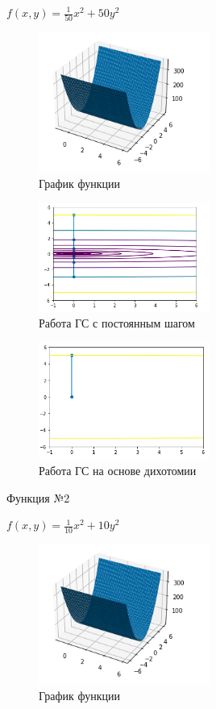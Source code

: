 $f(x,y) = \frac{1}{50}x^2 + 50y^2$

\begin{figure}[ht]
    \centering
    \includegraphics[width=0.5\textwidth]{images/g10.png}
    \caption{График функции}
    \label{fig:g10}
\end{figure}

\begin{figure}[ht]
    \centering
    \includegraphics[width=0.5\textwidth]{images/g11.png}
    \caption{Работа ГС с постоянным шагом}
    \label{fig:g11}
\end{figure}

\begin{figure}[ht]
    \centering
    \includegraphics[width=0.5\textwidth]{images/g12.png}
    \caption{Работа ГС на основе дихотомии}
    \label{fig:g12}
\end{figure}

\newpage

Функция №2

$f(x,y) = \frac{1}{10}x^2 + 10y^2$

\begin{figure}[ht]
    \centering
    \includegraphics[width=0.5\textwidth]{images/g10.png}
    \caption{График функции}
    \label{fig:g10}
\end{figure}

